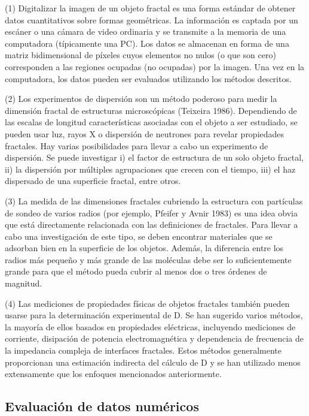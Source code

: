 \documentclass[11pt]{article}
\begin{document}
(1) Digitalizar la imagen de un objeto fractal es una forma estándar de obtener datos cuantitativos sobre formas geométricas. La información es captada por un escáner o una cámara de video ordinaria y se transmite a la memoria de una computadora (típicamente una PC). Los datos se almacenan en forma de una matriz bidimensional de píxeles cuyos elementos no nulos (o que son cero) corresponden a las regiones ocupadas (no ocupadas) por la imagen. Una vez en la computadora, los datos pueden ser evaluados utilizando los métodos descritos.

(2) Los experimentos de dispersión son un método poderoso para medir la dimensión fractal de estructuras microscópicas (Teixeira 1986). Dependiendo de las escalas de longitud características asociadas con el objeto a ser estudiado, se pueden usar luz, rayos X o dispersión de neutrones para revelar propiedades fractales. Hay varias posibilidades para llevar a cabo un experimento de dispersión. Se puede investigar i) el factor de estructura de un solo objeto fractal, ii) la dispersión por múltiples agrupaciones que crecen con el tiempo, iii) el haz dispersado de una superficie fractal, entre otros.

(3) La medida de las dimensiones fractales cubriendo la estructura con partículas de sondeo de varios radios (por ejemplo, Pfeifer y Avnir 1983) es una idea obvia que está directamente relacionada con las definiciones de fractales. Para llevar a cabo una investigación de este tipo, se deben encontrar materiales que se adsorban bien en la superficie de los objetos. Además, la diferencia entre los radios más pequeño y más grande de las moléculas debe ser lo suficientemente grande para que el método pueda cubrir al menos dos o tres órdenes de magnitud.


(4) Las mediciones de propiedades físicas de objetos fractales también pueden usarse para la determinación experimental de D. Se han sugerido varios métodos, la mayoría de ellos basados en propiedades eléctricas, incluyendo mediciones de corriente, disipación de potencia electromagnética y dependencia de frecuencia de la impedancia compleja de interfaces fractales. Estos métodos generalmente proporcionan una estimación indirecta del cálculo de D y se han utilizado menos extensamente que los enfoques mencionados anteriormente.

\subsection{Evaluación de datos numéricos}
\end{document}
